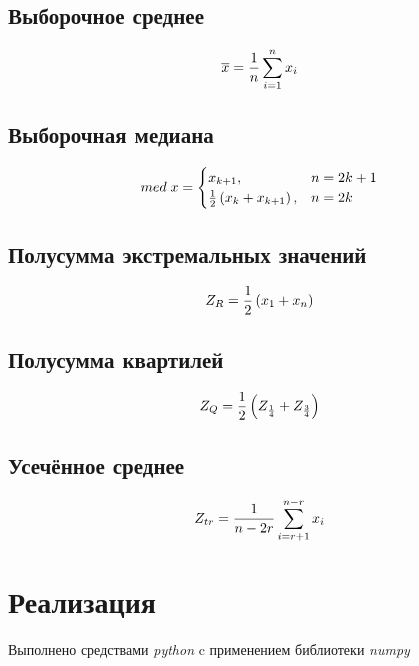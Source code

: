 \documentclass[12pt]{article}
\begin{document}
\subsection{Выборочное среднее}

\begin{equation}
\overline{x} = \frac{1}{n}\sum_{i=1}^n x_i \hfill \label{eqn:average}
\end{equation}

\subsection{Выборочная медиана}

\begin{equation}
med\; x = \begin{cases}
x_{k+1}, & n = 2k+1\\
\frac{1}{2}\left(x_k+x_{k+1}\right), & n = 2k
\end{cases} \hfill  \label{eqn:med}
\end{equation}

\subsection{Полусумма экстремальных значений}

\begin{equation} 
Z_R = \frac{1}{2}\left(x_1+x_n\right) \hfill  \label{eqn:mean_extr}
\end{equation}

\subsection{Полусумма квартилей}

\begin{equation}
Z_Q = \frac{1}{2}\left(Z_{\frac{1}{4}}+Z_{\frac{3}{4}}\right) \hfill  
\label{eqn:quartiles}
\end{equation}

\subsection{Усечённое среднее}

\begin{equation}
Z_{tr} = \frac{1}{n - 2r}\sum_{i=r+1}^{n-r} x_i \hfill  \label{eqn:cut_mean}
\end{equation}

\pagebreak

\section{Реализация}
Выполнено средствами \textit{python} c применением библиотеки \textit{numpy}
\end{document}
